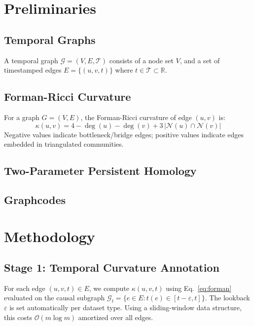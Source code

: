 \documentclass[conference]{IEEEtran}
\begin{document}
\section{Preliminaries}
\label{sec:prelim}

\subsection{Temporal Graphs}
A temporal graph $\mathcal{G} = (V, E, \mathcal{T})$ consists of a node
set $V$, and a set of timestamped edges $E = \{(u, v, t)\}$ where
$t \in \mathcal{T} \subset \mathbb{R}$.

\subsection{Forman-Ricci Curvature}
For a graph $G=(V,E)$, the Forman-Ricci curvature of edge $(u,v)$ is:
\begin{equation}
    \kappa(u,v) = 4 - \deg(u) - \deg(v) + 3\,|\mathcal{N}(u)\cap\mathcal{N}(v)|
    \label{eq:forman}
\end{equation}
Negative values indicate bottleneck/bridge edges; positive values
indicate edges embedded in triangulated communities.

\subsection{Two-Parameter Persistent Homology}

\subsection{Graphcodes}

\section{Methodology}
\label{sec:method}

\subsection{Stage 1: Temporal Curvature Annotation}
For each edge $(u,v,t) \in E$, we compute $\kappa(u,v,t)$ using
Eq.~\eqref{eq:forman} evaluated on the causal subgraph
$\mathcal{G}_t = \{e \in E : t(e) \in [t-\varepsilon, t]\}$.
The lookback $\varepsilon$ is set automatically per dataset type.
Using a sliding-window data structure, this costs $\mathcal{O}(m\log m)$
amortized over all edges.
\end{document}
